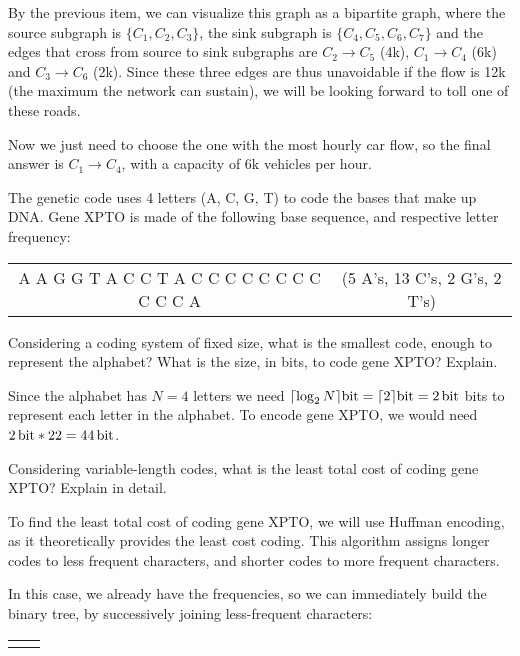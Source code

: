 {By the previous item, we can visualize this graph as a bipartite graph, where the source subgraph is $\{C_1, C_2, C_3\}$, the sink subgraph is $\{C_4, C_5, C_6, C_7\}$ and the edges that cross from source to sink subgraphs are $C_2 \rightarrow C_5$ (4k), $C_1 \rightarrow C_4$ (6k) and $C_3 \rightarrow C_6$ (2k). Since these three edges are thus unavoidable if the flow is 12k (the maximum the network can sustain), we will be looking forward to toll one of these roads.

Now we just need to choose the one with the most hourly car flow, so the final answer is $C_1 \rightarrow C_4$, with a capacity of 6k vehicles per hour.

The genetic code uses 4 letters (A, C, G, T) to code the bases that make up DNA. Gene XPTO is made of the following base sequence, and respective letter frequency:
\begin{center}\begin{tabular}{c c}
    A A G G T A C C T A C C C C C C C C C C C A & (5 A's, 13 C's, 2 G's, 2 T's)
\end{tabular}\end{center}

Considering a coding system of fixed size, what is the smallest code, enough to represent the alphabet? What is the size, in bits, to code gene XPTO? Explain.

\ansseparator

Since the alphabet has $N=4$ letters we need $\lceil \log_2 {N} \rceil \SI{}{\bit} = \lceil 2 \rceil \SI{}{\bit} = \SI{2}{\bit}$ bits to represent each letter in the alphabet. To encode gene XPTO, we would need $\SI{2}{\bit}*22=\SI{44}{\bit}$.

Considering variable-length codes, what is the least total cost of coding gene XPTO? Explain in detail.

\ansseparator

To find the least total cost of coding gene XPTO, we will use Huffman encoding, as it theoretically provides the least cost coding. This algorithm assigns longer codes to less frequent characters, and shorter codes to more frequent characters.

In this case, we already have the frequencies, so we can immediately build the binary tree, by successively joining less-frequent characters:

\begin{center} \begin{tabular}{P{75mm} | P{75mm}}
\end{tabular}
\end{center}}
